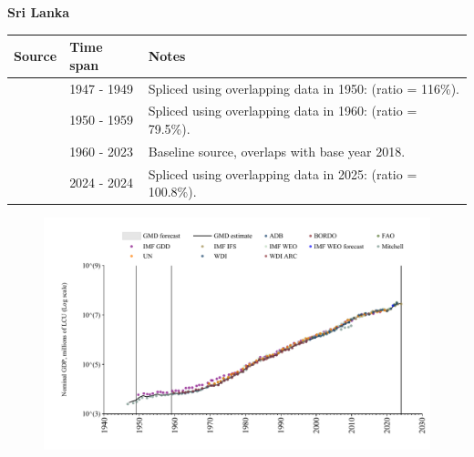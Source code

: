 \documentclass[12pt,a4paper,landscape]{article}
\begin{document}
\begin{adjustbox}{max totalsize={\paperwidth}{\paperheight},center}
\begin{minipage}[t][\textheight][t]{\textwidth}
\vspace*{0.5cm}
{}
\begin{center}
{\Large\bfseries Sri Lanka}
\end{center}
\vspace{0.5cm}
\begin{table}[H]
\centering
\small
\begin{tabular}{|l|l|l|}
\hline
\textbf{Source} & \textbf{Time span} & \textbf{Notes} \\
\hline
\rowcolor{white}\cite{Mitchell}& 1947 - 1949 &Spliced using overlapping data in 1950: (ratio = 116\%).\\
\rowcolor{lightgray}\cite{IMF_GDD}& 1950 - 1959 &Spliced using overlapping data in 1960: (ratio = 79.5\%).\\
\rowcolor{white}\cite{WDI}& 1960 - 2023 &Baseline source, overlaps with base year 2018.\\
\rowcolor{lightgray}\cite{IMF_IFS}& 2024 - 2024 &Spliced using overlapping data in 2025: (ratio = 100.8\%).\\
\hline
\end{tabular}
\end{table}
\begin{figure}[H]
\centering
\includegraphics[width=\textwidth,height=0.6\textheight,keepaspectratio]{graphs/LKA_nGDP.pdf}
\end{figure}
\end{minipage}
\end{adjustbox}
\end{document}
